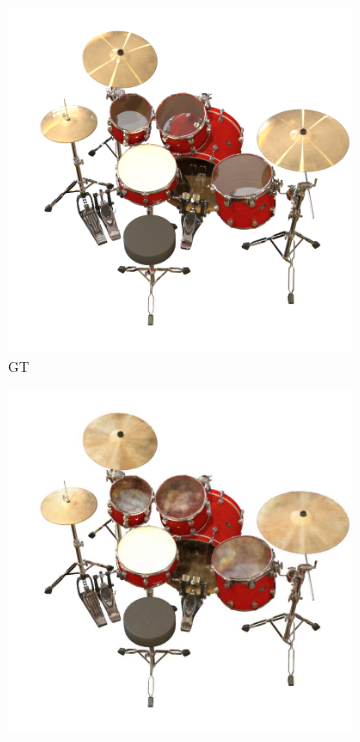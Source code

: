 \documentclass[12pt, a4paper, twoside]{book}
\numberwithin{equation}{chapter}
\numberwithin{theorem}{section}
\numberwithin{definition}{section}
\numberwithin{definitionChapter}{chapter}
\begin{document}
	\begin{figure}[H]
		\centering
		\begin{subfigure}{0.475\textwidth}
			\centering
			\includegraphics[scale=0.25]{img/gt/gt_drums_3.png}
			\caption{GT}
		\end{subfigure}
		\begin{subfigure}{0.475\textwidth}
			\centering
			\includegraphics[scale=0.25]{img/nerf/nerf_drums_3.jpg}

\end{subfigure}
\end{figure}
\end{document}
